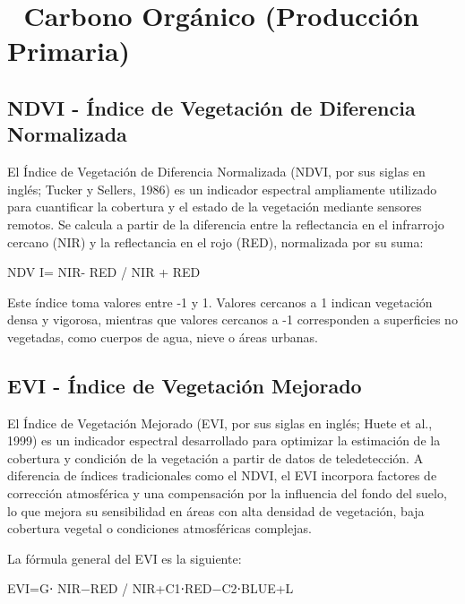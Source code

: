 \documentclass[
]{book}
\begin{document}
\section{\texorpdfstring{\textbf{🌱 Carbono Orgánico (Producción Primaria)}}{🌱 Carbono Orgánico (Producción Primaria)}}\label{carbono-orguxe1nico-producciuxf3n-primaria}

\subsection{\texorpdfstring{\textbf{NDVI} - Índice de Vegetación de Diferencia Normalizada}{NDVI - Índice de Vegetación de Diferencia Normalizada}}\label{ndvi---uxedndice-de-vegetaciuxf3n-de-diferencia-normalizada}

El Índice de Vegetación de Diferencia Normalizada (NDVI, por sus siglas en inglés; Tucker y Sellers, 1986) es un indicador espectral ampliamente utilizado para cuantificar la cobertura y el estado de la vegetación mediante sensores remotos. Se calcula a partir de la diferencia entre la reflectancia en el infrarrojo cercano (NIR) y la reflectancia en el rojo (RED), normalizada por su suma:

NDV I= NIR- RED / NIR + RED

Este índice toma valores entre -1 y 1. Valores cercanos a 1 indican vegetación densa y vigorosa, mientras que valores cercanos a -1 corresponden a superficies no vegetadas, como cuerpos de agua, nieve o áreas urbanas.

\subsection{\texorpdfstring{\textbf{EVI} - Índice de Vegetación Mejorado}{EVI - Índice de Vegetación Mejorado}}\label{evi---uxedndice-de-vegetaciuxf3n-mejorado}

El Índice de Vegetación Mejorado (EVI, por sus siglas en inglés; Huete et al., 1999) es un indicador espectral desarrollado para optimizar la estimación de la cobertura y condición de la vegetación a partir de datos de teledetección. A diferencia de índices tradicionales como el NDVI, el EVI incorpora factores de corrección atmosférica y una compensación por la influencia del fondo del suelo, lo que mejora su sensibilidad en áreas con alta densidad de vegetación, baja cobertura vegetal o condiciones atmosféricas complejas.

La fórmula general del EVI es la siguiente:

EVI=G⋅ NIR−RED / NIR+C1\hspace{0pt}⋅RED−C2\hspace{0pt}⋅BLUE+L
\end{document}
